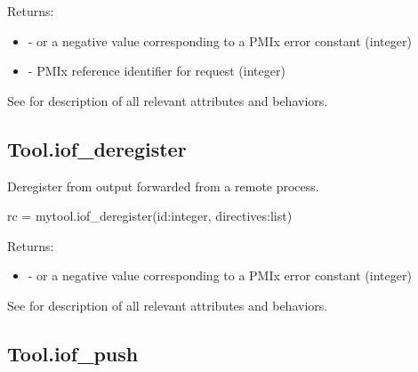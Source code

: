 Returns:

\begin{itemize}
    \item {} -  or a negative value corresponding to a PMIx error constant (integer)
    \item {} - \ac{PMIx} reference identifier for request (integer)
\end{itemize}

See  for description of all relevant attributes and behaviors.


\subsection{Tool.iof_deregister}

\summary

Deregister from output forwarded from a remote process.

\format

\pyspecificstart
\begin{codepar}
rc = mytool.iof_deregister(id:integer, directives:list)
\end{codepar}
\pyspecificend

\begin{arglist}
\end{arglist}

Returns:

\begin{itemize}
    \item {} -  or a negative value corresponding to a PMIx error constant (integer)
\end{itemize}

See  for description of all relevant attributes and behaviors.


\subsection{Tool.iof_push}

\summary

